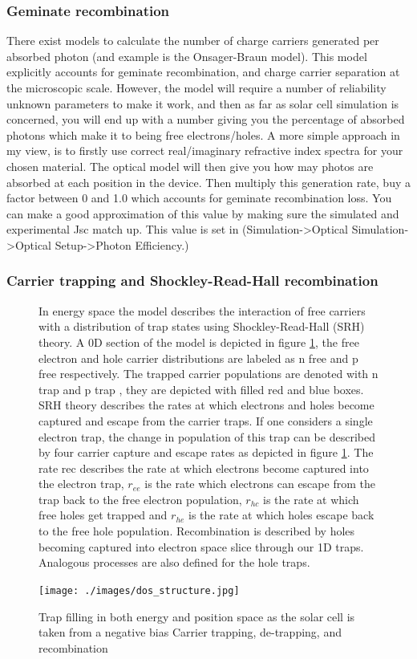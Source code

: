 \documentclass[11pt]{article}
\begin{document}
\subsubsection{Geminate recombination}
There exist models to calculate the number of charge carriers generated per absorbed photon (and example is the Onsager-Braun model).  This model explicitly accounts for geminate recombination, and charge carrier separation at the microscopic scale.  However, the model will require a number of reliability unknown parameters to make it work, and then as far as solar cell simulation is concerned, you will end up with a number giving you the percentage of absorbed photons which make it to being free electrons/holes.  A more simple approach in my view, is to firstly use correct real/imaginary refractive index spectra for your chosen material.  The optical model will then give you how may photos are absorbed at each position in the device.  Then multiply this generation rate, buy a factor between 0 and 1.0 which accounts for geminate recombination loss.  You can make a good approximation of this value by making sure the simulated and experimental Jsc match up.  This value is set in (Simulation->Optical Simulation->Optical Setup->Photon Efficiency.)


\subsubsection{Carrier trapping and Shockley-Read-Hall recombination}


\begin{figure}
In energy space the model describes the interaction of free carriers with a distribution of trap states using Shockley-Read-Hall (SRH) theory. A 0D section of the model is depicted in figure \ref{fig:dos_structure}, the free electron and hole carrier distributions are labeled as n free and p free respectively. The trapped carrier populations are denoted with n trap and p trap , they are depicted with filled red and blue boxes. SRH theory describes the rates at which electrons and holes become captured and escape from the carrier traps. If one considers a single electron trap, the change in population of this trap can be described by four carrier capture and escape rates as depicted in figure \ref{fig:dos_structure}. The rate rec describes the rate at which electrons become captured into the electron trap, $r_{ee}$ is the rate which electrons can escape from the trap back to the free electron population, $r_{hc}$ is the rate at which free holes get trapped and $r_{he}$ is the rate at which holes escape back to the free hole population. Recombination is described by holes becoming captured into electron space slice through our 1D traps. Analogous processes are also defined for the hole traps.

\centering
\texttt{[image: ./images/dos\_structure.jpg]}
\caption{Trap filling in both energy and position space as the solar cell is taken from a negative bias
Carrier trapping, de-trapping, and recombination}
\label{fig:dos_structure}
\end{figure}
\end{document}
